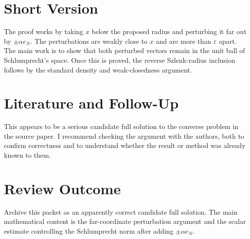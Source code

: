 \documentclass[11pt]{article}
\begin{document}
\section*{Short Version}

The proof works by taking \(x\) below the proposed radius and perturbing it
far out by \(\pm\alpha e_N\).  The perturbations are weakly close to \(x\)
and are more than \(\varepsilon\) apart.  The main work is to show that both
perturbed vectors remain in the unit ball of Schlumprecht's space.  Once this
is proved, the reverse Szlenk-radius inclusion follows by the standard
density and weak-closedness argument.

\section*{Literature and Follow-Up}

This appears to be a serious candidate full solution to the converse problem
in the source paper.  I recommend checking the argument with the authors,
both to confirm correctness and to understand whether the result or method
was already known to them.

\section*{Review Outcome}

Archive this packet as an apparently correct candidate full solution.  The
main mathematical content is the far-coordinate perturbation argument and
the scalar estimate controlling the Schlumprecht norm after adding
\(\pm\alpha e_N\).
\end{document}
